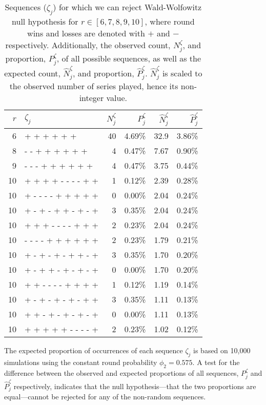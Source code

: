 \documentclass{article}
\begin{document}
\begin{table}

\caption{Sequences ($\zeta_j$) for which we can reject Wald-Wolfowitz null hypothesis for $r \in [6, 7, 8, 9, 10]$, where round wins and losses are denoted with $+$ and $-$ respectively. Additionally, the observed count, $N^{\zeta}_j$, and proportion, $P^{\zeta}_j$, of all possible sequences, as well as the expected count, $\hat{N}^{\zeta}_j$, and proportion, $\hat{P}^{\zeta}_j$. $\hat{N}^{\zeta}_j$ is scaled to the observed number of series played, hence its non-integer value.}

\centering
\begin{tabular}{rlrrrr}
\toprule
$r$ & $\zeta_j$ & $N^{\zeta}_j$ & $P^{\zeta}_j$ & $\hat{N}^{\zeta}_j$ & $\hat{P}^{\zeta}_j$ \\ 
\midrule
6 & + + + + + + & 40 & 4.69\% & 32.9 & 3.86\% \\
8 & - - + + + + + + & 4 & 0.47\% & 7.67 & 0.90\% \\ 
9 & - - - + + + + + + & 4 & 0.47\% & 3.75 & 0.44\% \\ 
10 & + + + + - - - - + + & 1 & 0.12\% & 2.39 & 0.28\% \\ 
10 & + - - - - + + + + + & 0 & 0.00\% & 2.04 & 0.24\% \\ 
10 & + - + - + + - + - + & 3 & 0.35\% & 2.04 & 0.24\% \\ 
10 & + + + - - - - + + + & 2 & 0.23\% & 2.04 & 0.24\% \\ 
10 & - - - - + + + + + + & 2 & 0.23\% & 1.79 & 0.21\% \\ 
10 & + - + - + - + + - + & 3 & 0.35\% & 1.70 & 0.20\% \\ 
10 & + - + + - + - + - + & 0 & 0.00\% & 1.70 & 0.20\% \\ 
10 & + + - - - - + + + + & 1 & 0.12\% & 1.19 & 0.14\% \\ 
10 & + - + - + - + - + + & 3 & 0.35\% & 1.11 & 0.13\% \\ 
10 & + + - + - + - + - + & 0 & 0.00\% & 1.11 & 0.13\% \\ 
10 & + + + + + - - - - + & 2 & 0.23\% & 1.02 & 0.12\% \\ 

\bottomrule
\end{tabular}

\label{tbl:ww-sequences}
\end{table}

The expected proportion of occurrences of each sequence \(\zeta_j\) is
based on 10,000 simulations using the constant round probability
\(\phi_2 = 0.575\). A test for the difference between the observed and
expected proportions of all sequences, \(P^{\zeta}_j\) and
\(\hat{P}^{\zeta}_j\) respectively, indicates that the null
hypothesis---that the two proportions are equal---cannot be rejected for
any of the non-random sequences.
\end{document}
